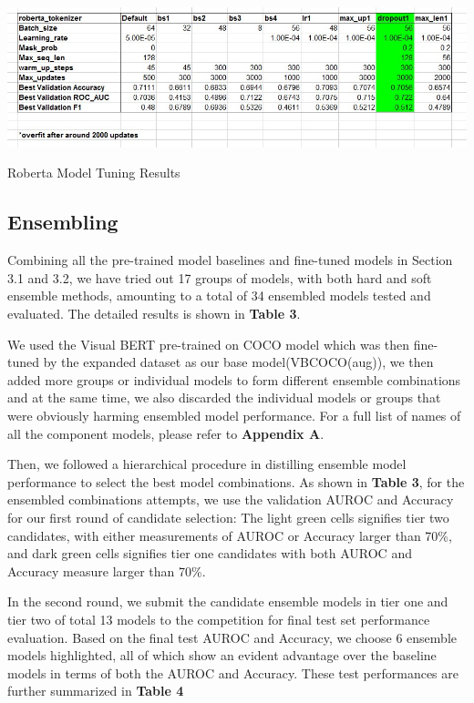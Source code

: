 \documentclass[10pt,twocolumn,letterpaper]{article}
\begin{document}
\begin{table}[h]
\begin{center}
\includegraphics[scale=0.7]{images/roberta.jpg}
\caption{Roberta Model Tuning Results}
\end{center}
\end{table}


\subsection{Ensembling}
Combining all the pre-trained model baselines and fine-tuned models in Section 3.1 and 3.2, we have tried out 17 groups of models, with both hard and soft ensemble methods, amounting to a total of 34 ensembled models tested and evaluated. The detailed results is shown in \textbf{Table 3}.

We used the Visual BERT pre-trained on COCO model which was then fine-tuned by the expanded dataset as our base model(VBCOCO(aug)), we then added more groups or individual models to form different ensemble combinations and at the same time, we also discarded the individual models or groups that were obviously harming ensembled model performance. For a full list of names of all the component models, please refer to \textbf{Appendix A}.

Then, we followed a hierarchical procedure in distilling ensemble model performance to select the best model combinations. As shown in \textbf{Table 3}, for the ensembled combinations attempts, we use the validation AUROC and Accuracy for our first round of candidate selection: The light green cells signifies tier two candidates, with either measurements of AUROC or Accuracy larger than 70\%, and dark green cells signifies tier one candidates with both AUROC and Accuracy measure larger than 70\%. 

In the second round, we submit the candidate ensemble models in tier one and tier two of total 13 models to the competition for final test set performance evaluation. Based on the final test AUROC and Accuracy, we choose 6 ensemble models highlighted, all of which show an evident advantage over the baseline models in terms of both the AUROC and Accuracy. These test performances are further summarized in \textbf{Table 4}
\end{document}
